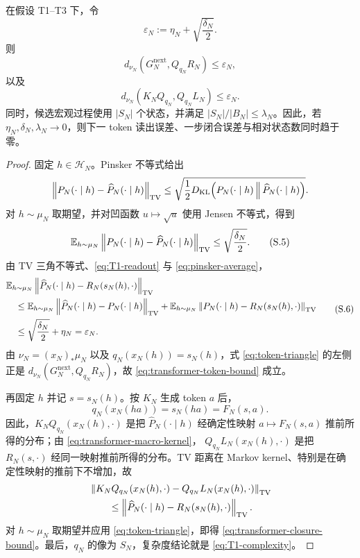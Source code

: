 \begin{theorem}[自回归预测状态的分布加权闭合]
\label{thm:transformer-weighted-closure}
在假设 \textup{T1--T3} 下，令
\[
 \varepsilon_N:=\eta_N+\sqrt{\frac{\delta_N}{2}}.
 \tag{S.2}\label{eq:transformer-epsilon}
\]
则
\[
 d_{\nu_N}\!\left(
 G_N^{\mathrm{next}},Q_{q_N}R_N
 \right)\le\varepsilon_N,
 \tag{S.3}\label{eq:transformer-token-bound}
\]
以及
\[
 d_{\nu_N}\!\left(
 K_NQ_{q_N},Q_{q_N}L_N
 \right)\le\varepsilon_N.
 \tag{S.4}\label{eq:transformer-closure-bound}
\]
同时，候选宏观过程使用 $|S_N|$ 个状态，并满足
$|S_N|/|B_N|\le\lambda_N$。因此，若
$\eta_N,\delta_N,\lambda_N\to0$，则下一 token 读出误差、一步闭合误差与相对状态数同时趋于零。
\end{theorem}

\begin{proof}
固定 $h\in\mathcal H_N$。Pinsker 不等式给出
\[
 \left\|P_N(\cdot\mid h)-\widehat P_N(\cdot\mid h)\right\|_{\operatorname{TV}}
 \le
 \sqrt{\frac12
 D_{\mathrm{KL}}\!\left(
 P_N(\cdot\mid h)\,\middle\|\,
 \widehat P_N(\cdot\mid h)
 \right)}.
\]
对 $h\sim\mu_N$ 取期望，并对凹函数 $u\mapsto\sqrt u$ 使用 Jensen 不等式，得到
\[
 \mathbb E_{h\sim\mu_N}
 \left\|P_N(\cdot\mid h)-\widehat P_N(\cdot\mid h)\right\|_{\operatorname{TV}}
 \le\sqrt{\frac{\delta_N}{2}}.
 \tag{S.5}\label{eq:pinsker-average}
\]
由 TV 三角不等式、\eqref{eq:T1-readout} 与
\eqref{eq:pinsker-average}，
\[
 \begin{aligned}
 &\mathbb E_{h\sim\mu_N}
 \left\|\widehat P_N(\cdot\mid h)
       -R_N(s_N(h),\cdot)\right\|_{\operatorname{TV}}\\
 &\quad\le
 \mathbb E_{h\sim\mu_N}
 \left\|\widehat P_N(\cdot\mid h)-P_N(\cdot\mid h)\right\|_{\operatorname{TV}}
 +\mathbb E_{h\sim\mu_N}
 \left\|P_N(\cdot\mid h)-R_N(s_N(h),\cdot)\right\|_{\operatorname{TV}}\\
 &\quad\le\sqrt{\frac{\delta_N}{2}}+\eta_N
 =\varepsilon_N.
 \end{aligned}
 \tag{S.6}\label{eq:token-triangle}
\]
由 $\nu_N=(x_N)_*\mu_N$ 以及
$q_N(x_N(h))=s_N(h)$，式 \eqref{eq:token-triangle} 的左侧正是
$d_{\nu_N}(G_N^{\mathrm{next}},Q_{q_N}R_N)$，故
\eqref{eq:transformer-token-bound} 成立。

再固定 $h$ 并记 $s=s_N(h)$。按 $K_N$ 生成 token $a$ 后，
\[
 q_N(x_N(ha))=s_N(ha)=F_N(s,a).
\]
因此，$K_NQ_{q_N}(x_N(h),\cdot)$ 是把
$\widehat P_N(\cdot\mid h)$ 经确定性映射
$a\mapsto F_N(s,a)$ 推前所得的分布；由
\eqref{eq:transformer-macro-kernel}，
$Q_{q_N}L_N(x_N(h),\cdot)$ 是把
$R_N(s,\cdot)$ 经同一映射推前所得的分布。TV 距离在 Markov kernel、特别是在确定性映射的推前下不增加，故
\[
 \begin{aligned}
 &\left\|K_NQ_{q_N}(x_N(h),\cdot)
       -Q_{q_N}L_N(x_N(h),\cdot)\right\|_{\operatorname{TV}}\\
 &\qquad\le
 \left\|\widehat P_N(\cdot\mid h)
       -R_N(s_N(h),\cdot)\right\|_{\operatorname{TV}}.
 \end{aligned}
\]
对 $h\sim\mu_N$ 取期望并应用 \eqref{eq:token-triangle}，即得
\eqref{eq:transformer-closure-bound}。最后，$q_N$ 的像为 $S_N$，复杂度结论就是 \eqref{eq:T1-complexity}。
\end{proof}

